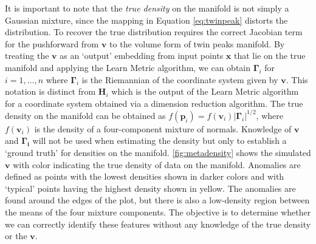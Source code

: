 \documentclass[11pt,a4paper,]{article}
\begin{document}
It is important to note that the \emph{true density} on the manifold is not simply a Gaussian mixture, since the mapping in Equation \eqref{eq:twinpeak} distorts the distribution. To recover the true distribution requires the correct Jacobian term for the pushforward from \(\pmb{v}\) to the volume form of twin peaks manifold. By treating the \(\pmb{v}\) as an `output' embedding from input points \(\pmb{x}\) that lie on the true manifold and applying the Learn Metric algorithm, we can obtain \(\pmb{\Gamma}_i\) for \(i=1,\dots,n\) where \(\pmb{\Gamma}_i\) is the Riemannian of the coordinate system given by \(\pmb{v}\). This notation is distinct from \(\pmb{H}_i\) which is the output of the Learn Metric algorithm for a coordinate system obtained via a dimension reduction algorithm. The true density on the manifold can be obtained as \(f(\pmb{p}_i)=f(\pmb{v}_i)|\pmb{\Gamma}_i|^{1/2}\), where \(f(\pmb{v}_i)\) is the density of a four-component mixture of normals. Knowledge of \(\pmb{v}\) and \(\pmb{\Gamma_i}\) will not be used when estimating the density but only to establish a `ground truth' for densities on the manifold. \autoref{fig:metadensity} shows the simulated \(\pmb{v}\) with color indicating the true density of data on the manifold. Anomalies are defined as points with the lowest densities shown in darker colors and with `typical' points having the highest density shown in yellow. The anomalies are found around the edges of the plot, but there is also a low-density region between the means of the four mixture components. The objective is to determine whether we can correctly identify these features without any knowledge of the true density or the \(\pmb{v}\).
\end{document}
